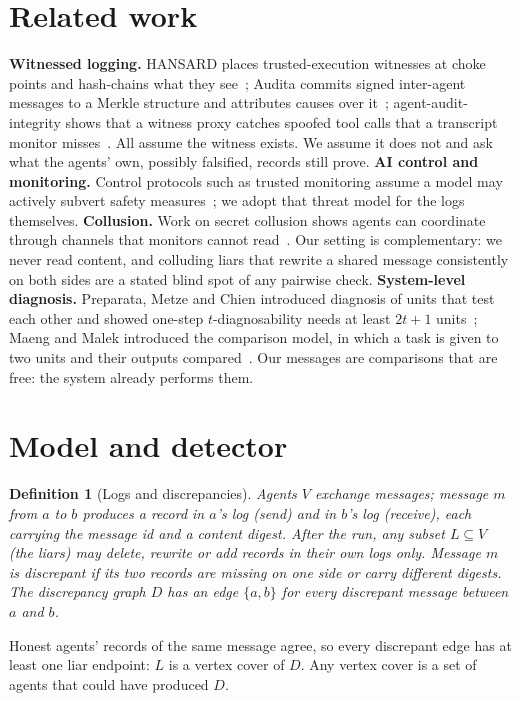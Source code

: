 \documentclass[10pt]{article}
\newtheorem{definition}{Definition}
\begin{document}
\section{Related work}
\textbf{Witnessed logging.} HANSARD places trusted-execution witnesses at choke points and hash-chains what
they see~\cite{hansard}; Audita commits signed inter-agent messages to a Merkle structure and attributes causes
over it~\cite{audita}; agent-audit-integrity shows that a witness proxy catches spoofed tool calls that a
transcript monitor misses~\cite{auditintegrity}. All assume the witness exists. We assume it does not and ask
what the agents' own, possibly falsified, records still prove.
\textbf{AI control and monitoring.} Control protocols such as trusted monitoring assume a model may actively
subvert safety measures~\cite{aicontrol}; we adopt that threat model for the logs themselves.
\textbf{Collusion.} Work on secret collusion shows agents can coordinate through channels that monitors cannot
read~\cite{motwani}. Our setting is complementary: we never read content, and colluding liars that rewrite a
shared message consistently on both sides are a stated blind spot of any pairwise check.
\textbf{System-level diagnosis.} Preparata, Metze and Chien introduced diagnosis of units that test each
other and showed one-step $t$-diagnosability needs at least $2t+1$ units~\cite{pmc}; Maeng and Malek introduced
the comparison model, in which a task is given to two units and their outputs compared~\cite{maengmalek}. Our
messages are comparisons that are free: the system already performs them.

\section{Model and detector}\label{sec:model}
\begin{definition}[Logs and discrepancies]
Agents $V$ exchange messages; message $m$ from $a$ to $b$ produces a record in $a$'s log (send) and in $b$'s
log (receive), each carrying the message id and a content digest. After the run, any subset $L \subseteq V$
(the liars) may delete, rewrite or add records in their own logs only. Message $m$ is \emph{discrepant} if its
two records are missing on one side or carry different digests. The \emph{discrepancy graph} $D$ has an edge
$\{a,b\}$ for every discrepant message between $a$ and $b$.
\end{definition}
Honest agents' records of the same message agree, so every discrepant edge has at least one liar endpoint:
$L$ is a vertex cover of $D$. Any vertex cover is a set of agents that could have produced $D$.
\end{document}

